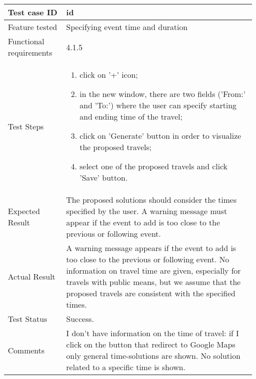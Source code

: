 \begin{table}[H]
	\begin{center}
		\begin{tabular}{ | p{} | p{} | }
		\hline
		Test case ID & id\\
		\hline
		Feature tested & Specifying event time and duration\\
		\hline
		Functional requirements & 4.1.5 \\
    	\hline
		Test Steps & 
			\begin{enumerate}
				\item click on '+' icon;
				\item in the new window, there are two fields ('From:' and 'To:') where the user can specify starting and ending time of the travel;
				\item click on 'Generate' button in order to visualize the proposed travels;
				\item select one of the proposed travels and click 'Save' button. 
			\end{enumerate} \\
		\hline
		Expected Result & The proposed solutions should consider the times specified by the user. A warning message must appear if the event to add is too close to the previous or following event.\\
		\hline
		Actual Result & A warning message appears if the event to add is too close to the previous or following event. No information on travel time are given, especially for travels with public means, but we assume that the proposed travels are consistent with the specified times.\\ 
		\hline
		Test Status & \color{ForestGreen}Success.\\ 
		\hline
		Comments & I don't have information on the time of travel: if I click on the button that redirect to Google Maps only general time-solutions are shown. No solution related to a specific time is shown. \\ 
		\hline
		
		\end{tabular}
	\end{center}
\end{table}

